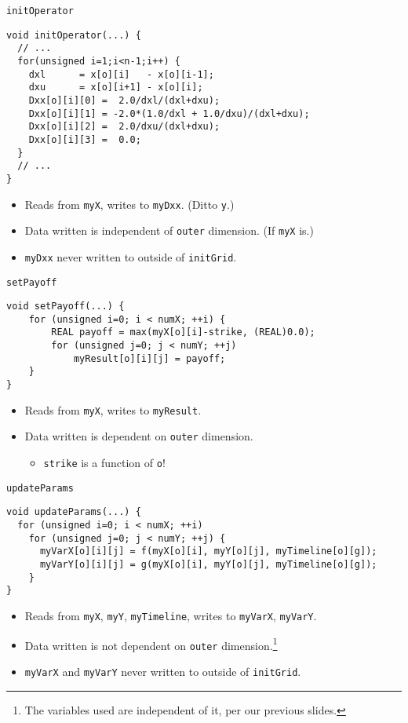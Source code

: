 \documentclass{beamer}
\begin{document}
\begin{frame}[fragile]{\texttt{initOperator}}
\begin{lstlisting}
void initOperator(...) {
  // ...
  for(unsigned i=1;i<n-1;i++) {
    dxl      = x[o][i]   - x[o][i-1];
    dxu      = x[o][i+1] - x[o][i];
    Dxx[o][i][0] =  2.0/dxl/(dxl+dxu);
    Dxx[o][i][1] = -2.0*(1.0/dxl + 1.0/dxu)/(dxl+dxu);
    Dxx[o][i][2] =  2.0/dxu/(dxl+dxu);
    Dxx[o][i][3] =  0.0;
  }
  // ...
}
\end{lstlisting}
\begin{itemize}
    \item Reads from \texttt{myX}, writes to \texttt{myDxx}. (Ditto \texttt{y}.)
    \item Data written is independent of \texttt{outer} dimension. (If \texttt{myX} is.)
    \item \texttt{myDxx} never written to outside of \texttt{initGrid}.
\end{itemize}
\end{frame}

\begin{frame}[fragile]{\texttt{setPayoff}}
\begin{lstlisting}
void setPayoff(...) {
    for (unsigned i=0; i < numX; ++i) {
        REAL payoff = max(myX[o][i]-strike, (REAL)0.0);
        for (unsigned j=0; j < numY; ++j)
            myResult[o][i][j] = payoff;
    }
}
\end{lstlisting}
\begin{itemize}
    \item Reads from \texttt{myX}, writes to \texttt{myResult}.
    \item Data written is dependent on \texttt{outer} dimension.
        \begin{itemize}
            \item \texttt{strike} is a function of \texttt{o}!
        \end{itemize}
\end{itemize}
\end{frame}

\begin{frame}[fragile]{\texttt{updateParams}}
\begin{lstlisting}
void updateParams(...) {
  for (unsigned i=0; i < numX; ++i)
    for (unsigned j=0; j < numY; ++j) {
      myVarX[o][i][j] = f(myX[o][i], myY[o][j], myTimeline[o][g]);
      myVarY[o][i][j] = g(myX[o][i], myY[o][j], myTimeline[o][g]);
    }
}
\end{lstlisting}
\begin{itemize}
    \item Reads from \texttt{myX}, \texttt{myY}, \texttt{myTimeline}, writes to \texttt{myVarX}, \texttt{myVarY}.
    \item Data written is not dependent on \texttt{outer} dimension.\footnote{The variables used are independent of it, per our previous slides.}
    \item \texttt{myVarX} and \texttt{myVarY} never written to outside of \texttt{initGrid}.
\end{itemize}
\end{frame}
\end{document}
